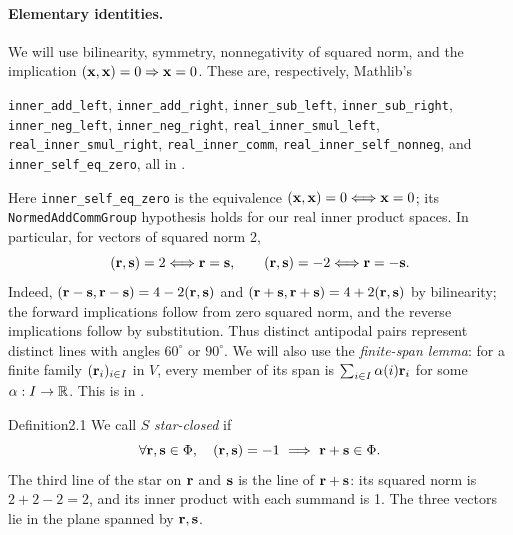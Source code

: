 \paragraph{Elementary identities.}\label{facts:inner}
We will use bilinearity, symmetry, nonnegativity of squared norm, and the implication
$({\mathbf x},{\mathbf x})=0\Rightarrow{\mathbf x}=0$. These are, respectively, Mathlib's\par
\begingroup\raggedright
\texttt{inner\_add\_left}, \texttt{inner\_add\_right},
\texttt{inner\_sub\_left}, \texttt{inner\_sub\_right},
\texttt{inner\_neg\_left}, \texttt{inner\_neg\_right},
\texttt{real\_inner\_smul\_left}, \texttt{real\_inner\_smul\_right},
\texttt{real\_inner\_comm}, \texttt{real\_inner\_self\_nonneg}, and
\texttt{inner\_self\_eq\_zero}, all in
.\par\endgroup
Here \texttt{inner\_self\_eq\_zero} is the equivalence
$({\mathbf x},{\mathbf x})=0\Longleftrightarrow{\mathbf x}=0$; its \texttt{NormedAddCommGroup}
hypothesis holds for our real inner product spaces.
In particular, for vectors of squared norm 2,
\begin{equation}\label{eq:endpoints}
 ({\mathbf r},{\mathbf s})=2\Longleftrightarrow{\mathbf r}={\mathbf s},
 \qquad ({\mathbf r},{\mathbf s})=-2\Longleftrightarrow{\mathbf r}=-{\mathbf s}.
\end{equation}
Indeed, $({\mathbf r}-{\mathbf s},{\mathbf r}-{\mathbf s})=4-2({\mathbf r},{\mathbf s})$ and
$({\mathbf r}+{\mathbf s},{\mathbf r}+{\mathbf s})=4+2({\mathbf r},{\mathbf s})$ by bilinearity; the forward implications follow
from zero squared norm, and the reverse implications follow by substitution.
Thus distinct antipodal pairs represent distinct lines with angles $60^\circ$ or $90^\circ$.
We will also use the \emph{finite-span lemma}: for a finite family $({\mathbf r}_i)_{i\in I}$
in $V$, every member of its span is $\sum_{i\in I}\alpha(i){\mathbf r}_i$ for some
$\alpha:I\to{\mathbb R}$. This is
 in
.

\begin{cgss}{Definition}{2.1}\label{def:2.1}
 We call $S$ \emph{star-closed} if
 \[
  \forall\Zr,\Zs\in\Phi,\quad (\Zr,\Zs)=-1\ \Longrightarrow\ \Zr+\Zs\in\Phi.
 \]
 The third line of the star on ${\mathbf r}$ and ${\mathbf s}$ is the line of ${\mathbf r}+{\mathbf s}$:
 its squared norm is $2+2-2=2$, and its inner product with each summand is 1.
 The three vectors lie in the plane spanned by ${\mathbf r},{\mathbf s}$.
\end{cgss}

